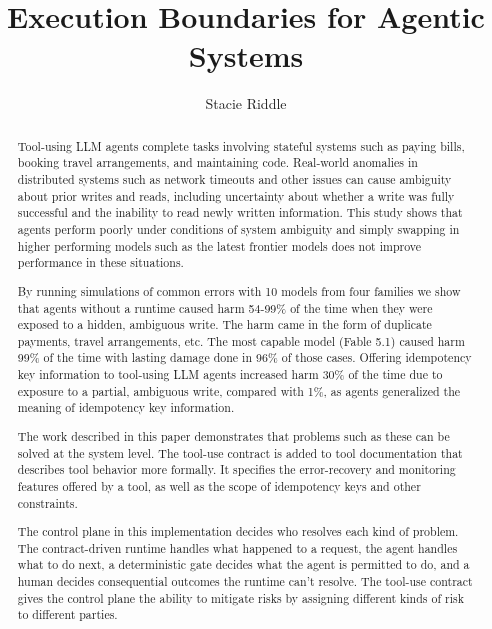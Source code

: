 \documentclass[letterpaper,twocolumn,10pt]{article}
\begin{document}
\date{}
\title{\Large \bf Execution Boundaries for Agentic Systems}
\author{{\rm Stacie Riddle}}

\maketitle

\begin{abstract}
Tool-using LLM agents complete tasks involving stateful systems such as paying bills, booking travel arrangements, and maintaining code. Real-world anomalies in distributed systems such as network timeouts and other issues can cause ambiguity about prior writes and reads, including uncertainty about whether a write was fully successful and the inability to read newly written information. This study shows that agents perform poorly under conditions of system ambiguity and simply swapping in higher performing models such as the latest frontier models does not improve performance in these situations.

By running simulations of common errors with 10 models from four families we show that agents without a runtime caused harm 54-99\% of the time when they were exposed to a hidden, ambiguous write. The harm came in the form of duplicate payments, travel arrangements, etc. The most capable model (Fable 5.1) caused harm 99\% of the time with lasting damage done in 96\% of those cases. Offering idempotency key information to tool-using LLM agents increased harm 30\% of the time due to exposure to a partial, ambiguous write, compared with 1\%, as agents generalized the meaning of idempotency key information.

The work described in this paper demonstrates that problems such as these can be solved at the system level. The tool-use contract is added to tool documentation that describes tool behavior more formally. It specifies the error-recovery and monitoring features offered by a tool, as well as the scope of idempotency keys and other constraints.

The control plane in this implementation decides who resolves each kind of problem. The contract-driven runtime handles what happened to a request, the agent handles what to do next, a deterministic gate decides what the agent is permitted to do, and a human decides consequential outcomes the runtime can't resolve. The tool-use contract gives the control plane the ability to mitigate risks by assigning different kinds of risk to different parties.


\end{abstract}
\end{document}
